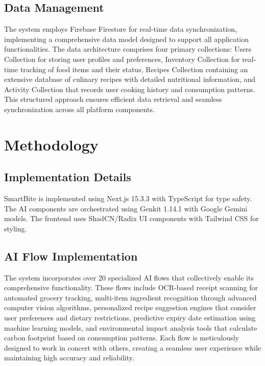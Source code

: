 \documentclass[conference]{IEEEtran}
\begin{document}
\subsection{Data Management}
The system employs Firebase Firestore for real-time data synchronization, implementing a comprehensive data model designed to support all application functionalities. The data architecture comprises four primary collections: Users Collection for storing user profiles and preferences, Inventory Collection for real-time tracking of food items and their status, Recipes Collection containing an extensive database of culinary recipes with detailed nutritional information, and Activity Collection that records user cooking history and consumption patterns. This structured approach ensures efficient data retrieval and seamless synchronization across all platform components.

\section{Methodology}

\subsection{Implementation Details}
SmartBite is implemented using Next.js 15.3.3 with TypeScript for type safety. The AI components are orchestrated using Genkit 1.14.1 with Google Gemini models. The frontend uses ShadCN/Radix UI components with Tailwind CSS for styling.

\subsection{AI Flow Implementation}
The system incorporates over 20 specialized AI flows that collectively enable its comprehensive functionality. These flows include OCR-based receipt scanning for automated grocery tracking, multi-item ingredient recognition through advanced computer vision algorithms, personalized recipe suggestion engines that consider user preferences and dietary restrictions, predictive expiry date estimation using machine learning models, and environmental impact analysis tools that calculate carbon footprint based on consumption patterns. Each flow is meticulously designed to work in concert with others, creating a seamless user experience while maintaining high accuracy and reliability.
\end{document}
